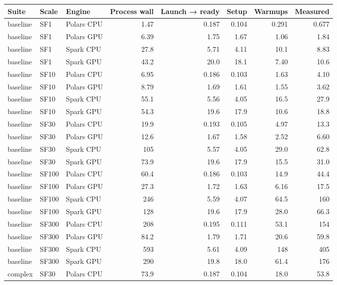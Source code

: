 \begin{longtable}{lllrrrrr}
\toprule
Suite & Scale & Engine & Process wall & Launch → ready & Setup & Warmups & Measured \\
\midrule
\endhead
\bottomrule
\endfoot
baseline & SF1 & Polars CPU & 1.47 & 0.187 & 0.104 & 0.291 & 0.677 \\
baseline & SF1 & Polars GPU & 6.39 & 1.75 & 1.67 & 1.06 & 1.84 \\
baseline & SF1 & Spark CPU & 27.8 & 5.71 & 4.11 & 10.1 & 8.83 \\
baseline & SF1 & Spark GPU & 43.2 & 20.0 & 18.1 & 7.40 & 10.6 \\
baseline & SF10 & Polars CPU & 6.95 & 0.186 & 0.103 & 1.63 & 4.10 \\
baseline & SF10 & Polars GPU & 8.79 & 1.69 & 1.61 & 1.55 & 3.62 \\
baseline & SF10 & Spark CPU & 55.1 & 5.56 & 4.05 & 16.5 & 27.9 \\
baseline & SF10 & Spark GPU & 54.3 & 19.6 & 17.9 & 10.6 & 18.8 \\
baseline & SF30 & Polars CPU & 19.9 & 0.193 & 0.105 & 4.97 & 13.3 \\
baseline & SF30 & Polars GPU & 12.6 & 1.67 & 1.58 & 2.52 & 6.60 \\
baseline & SF30 & Spark CPU & 105 & 5.57 & 4.05 & 29.0 & 62.8 \\
baseline & SF30 & Spark GPU & 73.9 & 19.6 & 17.9 & 15.5 & 31.0 \\
baseline & SF100 & Polars CPU & 60.4 & 0.186 & 0.103 & 14.9 & 44.4 \\
baseline & SF100 & Polars GPU & 27.3 & 1.72 & 1.63 & 6.16 & 17.5 \\
baseline & SF100 & Spark CPU & 246 & 5.59 & 4.07 & 64.5 & 160 \\
baseline & SF100 & Spark GPU & 128 & 19.6 & 17.9 & 28.0 & 66.3 \\
baseline & SF300 & Polars CPU & 208 & 0.195 & 0.111 & 53.1 & 154 \\
baseline & SF300 & Polars GPU & 84.2 & 1.79 & 1.71 & 20.6 & 59.8 \\
baseline & SF300 & Spark CPU & 593 & 5.61 & 4.09 & 148 & 405 \\
baseline & SF300 & Spark GPU & 290 & 19.8 & 18.0 & 61.4 & 176 \\
complex & SF30 & Polars CPU & 73.9 & 0.187 & 0.104 & 18.0 & 53.8 \\

\end{longtable}
